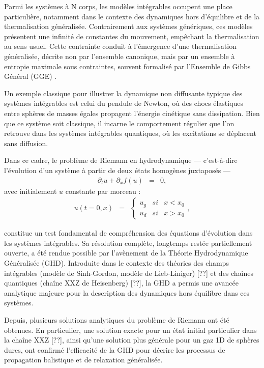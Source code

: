 Parmi les systèmes à N corps, les modèles intégrables occupent une place particulière, notamment dans le contexte des dynamiques hors d’équilibre et de la thermalisation généralisée. Contrairement aux systèmes génériques, ces modèles présentent une infinité de constantes du mouvement, empêchant la thermalisation au sens usuel. Cette contrainte conduit à l’émergence d’une thermalisation généralisée, décrite non par l’ensemble canonique, mais par un ensemble à entropie maximale sous contraintes, souvent formalisé par l’Ensemble de Gibbs Général (GGE) .

Un exemple classique pour illustrer la dynamique non diffusante typique des systèmes intégrables est celui du pendule de Newton, où des chocs élastiques entre sphères de masses égales propagent l’énergie cinétique sans dissipation. Bien que ce système soit classique, il incarne le comportement régulier que l’on retrouve dans les systèmes intégrables quantiques, où les excitations se déplacent sans diffusion.

Dans ce cadre, le problème de Riemann en hydrodynamique — c’est-à-dire l’évolution d’un système à partir de deux états homogènes juxtaposés — 
\begin{eqnarray*}
	\partial_t u + \partial_x f(u) & = & 0 ,
\end{eqnarray*}
avec initialement $u$ constante par morceau :
\begin{eqnarray*}
	u(t=0 , x) & = & \left \{\begin{array}{rcl} u_g & si& x<x_0 \\ u_d & si & x > x_0 \end{array} \right.	,
\end{eqnarray*}

constitue un test fondamental de compréhension des équations d’évolution dans les systèmes intégrables. Sa résolution complète, longtemps restée partiellement ouverte, a été rendue possible par l’avènement de la Théorie Hydrodynamique Généralisée (GHD). Introduite dans le contexte des théories des champs intégrables (modèle de Sinh-Gordon, modèle de Lieb-Liniger) [??] et des chaînes quantiques (chaîne XXZ de Heisenberg) [??], la GHD a permis une avancée analytique majeure pour la description des dynamiques hors équilibre dans ces systèmes.

Depuis, plusieurs solutions analytiques du problème de Riemann ont été obtenues. En particulier, une solution exacte pour un état initial particulier dans la chaîne XXZ [??], ainsi qu’une solution plus générale pour un gaz 1D de sphères dures, ont confirmé l’efficacité de la GHD pour décrire les processus de propagation balistique et de relaxation généralisée.

